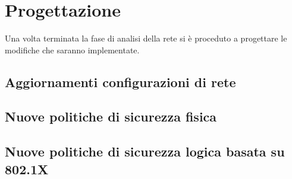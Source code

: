 \documentclass[Realizzazione.tex]{subfiles}
\begin{document}
\section{Progettazione}
	
Una volta terminata la fase di analisi della rete si è proceduto a progettare le modifiche che saranno implementate. \\

\subsection{Aggiornamenti configurazioni di rete}
\subsection{Nuove politiche di sicurezza fisica}
\subsection{Nuove politiche di sicurezza logica basata su 802.1X}
\end{document}
